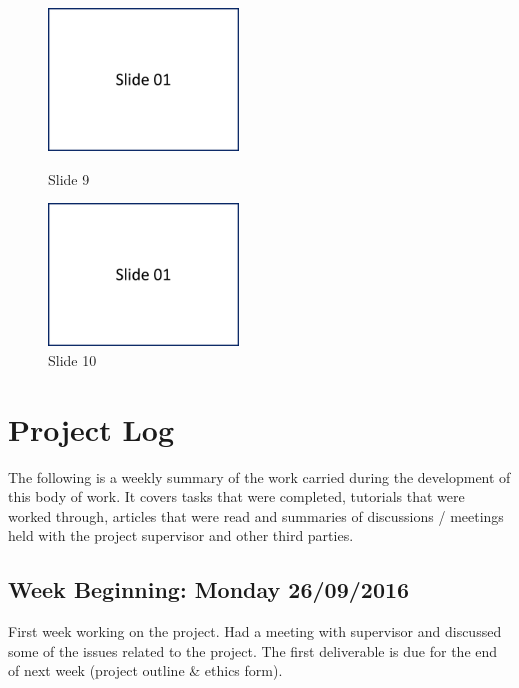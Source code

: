 \begin{figure}[H]
\parbox{74.mm}{
    \centering
    \includegraphics[width=0.45\textwidth,page=9]{resources/PresentationSlides}
    \caption*{Slide 9}
}
    \parbox{74.mm}{
    \centering
    \includegraphics[width=0.45\textwidth,page=10]{resources/PresentationSlides}
    \caption*{Slide 10}
}
\end{figure}

\chapter{Project Log}

The following is a weekly summary of the work carried during the development of this body of work. It covers tasks that were completed, tutorials that were worked through, articles that were read and summaries of discussions / meetings held with the project supervisor and other third parties. 

\section*{Week Beginning: Monday 26/09/2016}

First week working on the project. Had a meeting with supervisor and discussed some of the issues related to the project. The first deliverable is due for the end of next week (project outline \& ethics form). 

